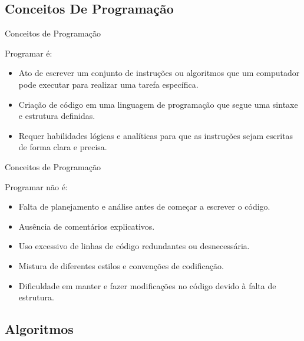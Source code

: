 \documentclass{beamer}
\begin{document}
\subsection{Conceitos De Programação}

\begin{frame}{Conceitos de Programação}

	Programar é:
	
	\begin{itemize}
		\item Ato de escrever um conjunto de instruções ou algoritmos que um computador pode executar para realizar uma tarefa específica.
		\item Criação de código em uma linguagem de programação que segue uma sintaxe e estrutura definidas.
		\item Requer habilidades lógicas e analíticas para que as instruções sejam escritas de forma clara e precisa.
	\end{itemize}

\end{frame}

\begin{frame}{Conceitos de Programação}
	
	Programar não é:
	
	\begin{itemize}
		\item Falta de planejamento e análise antes de começar a escrever o código.
		\item Ausência de comentários explicativos.
		\item Uso excessivo de linhas de código redundantes ou desnecessária.
		\item Mistura de diferentes estilos e convenções de codificação.
		\item Dificuldade em manter e fazer modificações no código devido à falta de estrutura.
	\end{itemize}
	
\end{frame}

\subsection{Algoritmos}
\end{document}
